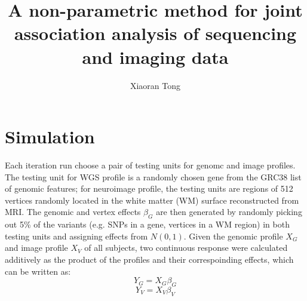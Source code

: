 \documentclass[twocolumn]{article}
\author{Xiaoran Tong}
\begin{document}
\title{A non-parametric method for joint association analysis of sequencing and imaging data}
\maketitle

\section{Simulation}

Each iteration run choose a pair of testing units for genomc and image profiles. The testing unit for WGS profile is a randomly chosen gene from the GRC38 list of genomic features; for neuroimage profile, the testing units are regions of 512 vertices randomly located in the white matter (WM) surface reconstructed from MRI. The genomic and vertex effects $\beta_G$ are then generated by randomly picking out 5\% of the variants (e.g. SNPs in a gene, vertices in a WM region) in both testing units and assigning effects from $N(0,1)$. Given the genomic profile $X_G$ and image profile $X_V$ of all subjects, two continuous response were calculated additively as the product of the profiles and their correspoinding effects, which can be written as:
\[Y_G = X_G \beta_G \]
\[Y_V = X_V \beta_V \]


\end{document}
